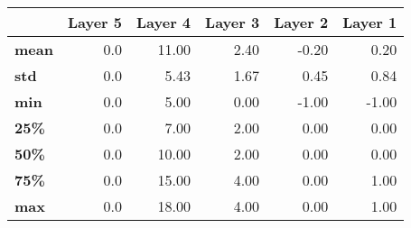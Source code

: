 \begin{tabular}{lrrrrr}
\toprule
{} &  Layer 5 &  Layer 4 &  Layer 3 &  Layer 2 &  Layer 1 \\
\midrule
\textbf{mean} &      0.0 &    11.00 &     2.40 &    -0.20 &     0.20 \\
\textbf{std } &      0.0 &     5.43 &     1.67 &     0.45 &     0.84 \\
\textbf{min } &      0.0 &     5.00 &     0.00 &    -1.00 &    -1.00 \\
\textbf{25\% } &      0.0 &     7.00 &     2.00 &     0.00 &     0.00 \\
\textbf{50\% } &      0.0 &    10.00 &     2.00 &     0.00 &     0.00 \\
\textbf{75\% } &      0.0 &    15.00 &     4.00 &     0.00 &     1.00 \\
\textbf{max } &      0.0 &    18.00 &     4.00 &     0.00 &     1.00 \\
\bottomrule
\end{tabular}
